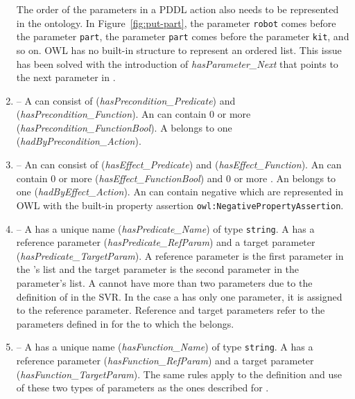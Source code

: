 \begin{enumerate}
    The order of the parameters in a PDDL action also needs to be represented
in the ontology. In Figure~\ref{fig:put-part}, the parameter \texttt{robot}
comes before the parameter \texttt{part}, the parameter \texttt{part} comes
before the parameter \texttt{kit}, and so on. OWL has no built-in structure
to represent an ordered list. This issue has been solved with the introduction
of \emph{hasParameter\_Next} that points to the next parameter in .
\item {} -- A  can consist of 
(\emph{hasPrecondition\_Predicate}) and  (\emph{hasPrecondition\_Function}).
An  can contain 0 or more 
(\emph{hasPrecondition\_FunctionBool}). A  belongs to one 
(\emph{hadByPrecondition\_Action}).
\item {} -- An  can consist of 
(\emph{hasEffect\_Predicate}) and  (\emph{hasEffect\_Function}).
An  can contain 0 or more  (\emph{hasEffect\_FunctionBool})
and 0 or more . An  belongs to one 
(\emph{hadByEffect\_Action}). An  can contain negative 
which are represented in OWL with the built-in property assertion \texttt{owl:NegativePropertyAssertion}.
\item {} -- A  has a unique name (\emph{hasPredicate\_Name})
of type \texttt{string}. A  has a reference parameter
(\emph{hasPredicate\_RefParam}) and a target parameter (\emph{hasPredicate\_TargetParam}).
A reference parameter is the first parameter in the 's list and the target
parameter is the second parameter in the parameter's list. A  cannot have
more than two parameters due to the definition of  in the SVR. In the
case a  has only one parameter, it is assigned to the reference parameter.
Reference and target parameters refer to the parameters defined in 
for the  to which the  belongs.
\item {} -- A  has a unique name (\emph{hasFunction\_Name})
of type \texttt{string}. A  has a reference parameter (\emph{hasFunction\_RefParam})
and a target parameter (\emph{hasFunction\_TargetParam}). The same rules apply to the
definition and use of these two types of parameters as the ones described for .

\end{enumerate}
